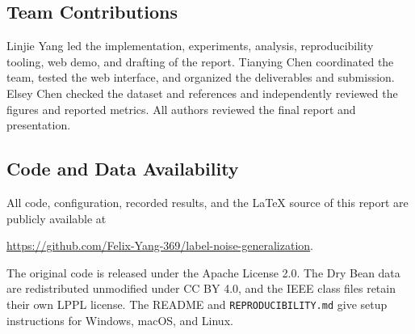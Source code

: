 \documentclass[conference,letterpaper]{IEEEtran}
\newcommand{\code}[1]{\texttt{#1}}
\begin{document}
\subsection{Team Contributions}
Linjie Yang led the implementation, experiments, analysis, reproducibility tooling, web demo, and drafting of the report. Tianying Chen coordinated the team, tested the web interface, and organized the deliverables and submission. Elsey Chen checked the dataset and references and independently reviewed the figures and reported metrics. All authors reviewed the final report and presentation.

\subsection{Code and Data Availability}
All code, configuration, recorded results, and the \LaTeX{} source of this report are publicly available at
\begin{center}
\footnotesize
\url{https://github.com/Felix-Yang-369/label-noise-generalization}.
\end{center}
The original code is released under the Apache License 2.0. The Dry Bean data are redistributed unmodified under CC BY 4.0, and the IEEE class files retain their own LPPL license. The README and \code{REPRODUCIBILITY.md} give setup instructions for Windows, macOS, and Linux.

\clearpage
\nobalance


\end{document}
